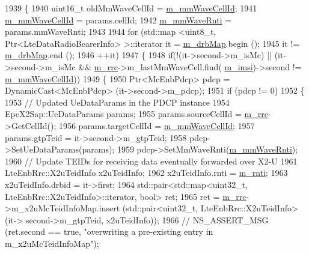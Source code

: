 \begin{DoxyCode}
1939 \{
1940   uint16\_t oldMmWaveCellId = \hyperlink{classns3_1_1UeManager_a0f53cb816bd8a3ad6227dc9adca671b2}{m\_mmWaveCellId};
1941   \hyperlink{classns3_1_1UeManager_a0f53cb816bd8a3ad6227dc9adca671b2}{m\_mmWaveCellId} = params.cellId;
1942   \hyperlink{classns3_1_1UeManager_a3d5cf7dc8a13b9e2616ecb9a70faebd3}{m\_mmWaveRnti} = params.mmWaveRnti;
1943 
1944   \textcolor{keywordflow}{for} (std::map <uint8\_t, Ptr<LteDataRadioBearerInfo> >::iterator it = \hyperlink{classns3_1_1UeManager_a18499c025730b63c73e5d93effff57aa}{m\_drbMap}.begin ();
1945      it != \hyperlink{classns3_1_1UeManager_a18499c025730b63c73e5d93effff57aa}{m\_drbMap}.end ();
1946      ++it)
1947   \{
1948     \textcolor{keywordflow}{if}(!(it->second->m\_isMc) || (it->second->m\_isMc && \hyperlink{classns3_1_1UeManager_ab4405e9f354c66e7c1a4c95832290f5b}{m\_rrc}->m\_lastMmWaveCell.find(
      \hyperlink{classns3_1_1UeManager_a868dda076ecfc1d4202e357c16223d84}{m\_imsi})->second != \hyperlink{classns3_1_1UeManager_a0f53cb816bd8a3ad6227dc9adca671b2}{m\_mmWaveCellId}))
1949     \{
1950       Ptr<McEnbPdcp> pdcp = DynamicCast<McEnbPdcp> (it->second->m\_pdcp); 
1951       \textcolor{keywordflow}{if} (pdcp != 0)
1952       \{
1953         \textcolor{comment}{// Updated UeDataParams in the PDCP instance}
1954         EpcX2Sap::UeDataParams params;
1955         params.sourceCellId = \hyperlink{classns3_1_1UeManager_ab4405e9f354c66e7c1a4c95832290f5b}{m\_rrc}->GetCellId();
1956         params.targetCellId = \hyperlink{classns3_1_1UeManager_a0f53cb816bd8a3ad6227dc9adca671b2}{m\_mmWaveCellId};
1957         params.gtpTeid = it->second->m\_gtpTeid;
1958         pdcp->SetUeDataParams(params);
1959         pdcp->SetMmWaveRnti(\hyperlink{classns3_1_1UeManager_a3d5cf7dc8a13b9e2616ecb9a70faebd3}{m\_mmWaveRnti});
1960         \textcolor{comment}{// Update TEIDs for receiving data eventually forwarded over X2-U }
1961         LteEnbRrc::X2uTeidInfo x2uTeidInfo;
1962         x2uTeidInfo.rnti = \hyperlink{classns3_1_1UeManager_a5a72b4fe818f21993bd7f05d7e2c4f83}{m\_rnti};
1963         x2uTeidInfo.drbid = it->first;
1964         std::pair<std::map<uint32\_t, LteEnbRrc::X2uTeidInfo>::iterator, \textcolor{keywordtype}{bool}> ret;
1965         ret = \hyperlink{classns3_1_1UeManager_ab4405e9f354c66e7c1a4c95832290f5b}{m\_rrc}->m\_x2uMcTeidInfoMap.insert (std::pair<uint32\_t, LteEnbRrc::X2uTeidInfo> (it->
      second->m\_gtpTeid, x2uTeidInfo));
1966         \textcolor{comment}{// NS\_ASSERT\_MSG (ret.second == true, "overwriting a pre-existing entry in m\_x2uMcTeidInfoMap");}

\end{DoxyCode}
